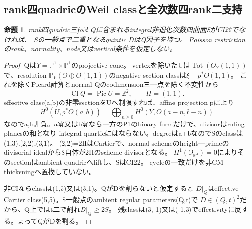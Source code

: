 \documentclass[a4paper,11pt]{ltjsarticle}
\newtheorem{proposition}{命題}[section]
\theoremstyle{definition}
\begin{document}
\subsection{rank四quadricのWeil classと全次数四rank二支持}
\begin{proposition}\label{prop:quartic-rankfour-quadric-double-empty}
rank四quadric三fold Qに含まれるintegral非退化次数四曲面SがCI22でなければ、
Sの一般点で二重となるquintic DはQ因子を持つ。
Poisson restrictionのrank、normality、node又はvertical条件を仮定しない。
\end{proposition}
\begin{proof}
Qは$Y=\mathbb P^1\times\mathbb P^1$のprojective cone。
vertexを除いたUは$\operatorname{Tot}(O_Y(1,1))$で、resolution
$\mathbb P_Y(O\oplus O(1,1))$のnegative section classは$\xi-p^*O(1,1)$。
これを除くPicard計算とnormal Qのcodimension三一点を除く不変性から
\[
 \operatorname{Cl}Q=\operatorname{Pic}U=\mathbb Z^2,\qquad H=(1,1).
\]
effective class(a,b)の非零sectionをUへ制限すれば、affine projection pにより
\[
 H^0(U,p^*O(a,b))=\bigoplus_{n\ge0}H^0(Y,O(a-n,b-n))
\]
なのでa,b非負。a零又はb零なら一方のP1のbinary formだけで、divisorはruling planesの和となり
integral quarticにはならない。degreeはa+bなのでSのclassは(1,3),(2,2),(3,1)。
(2,2)=2HはCartierで、normal schemeのheight一primeのdivisorial idealからS自体が2Hのscheme divisorとなる。
$H^1(O_{\mathbb P^4})=0$によりそのsectionはambient quadricへliftし、SはCI22。
cycleの一致だけを非CM thickeningへ置換していない。

非CIならclassは(1,3)又は(3,1)。QがDを割らないと仮定すると
$D|_Q$はeffective Cartier class(5,5)。S一般点のambient regular parameters(Q,t)で
$D\in(Q,t)^2$だから、Q上ではt二で割れ$D|_Q\ge2S$。
残classは(3,-1)又は(-1,3)でeffectivityに反する。よってQがDを割る。
\end{proof}
\end{document}
